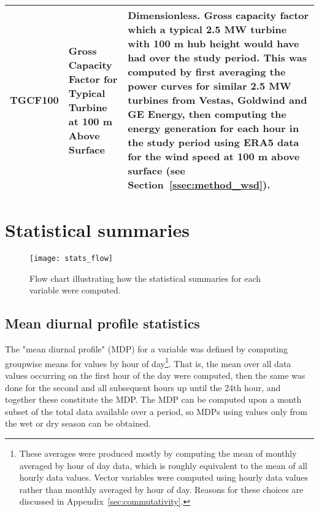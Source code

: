 \begin{landscape}
\begin{longtable}{P{2cm}P{3cm}P{15cm}}
			TGCF100 & Gross Capacity Factor for Typical Turbine at 100 m Above Surface & Dimensionless. Gross capacity factor which a typical 2.5 MW turbine with 100 m hub height would have had over the study period. This was computed by first averaging the power curves for similar 2.5 MW turbines from Vestas, Goldwind and GE Energy, then computing the energy generation for each hour in the study period using ERA5 data for the wind speed at 100 m above surface (see Section~\ref{ssec:method_wsd}). \\ \bottomrule
		\end{longtable}

	\endgroup
\end{landscape}

\section{Statistical summaries}
\label{sec:method_stats}

\begin{figure}[!ht]
	\centering
	\texttt{[image: stats\_flow]}
	\caption[Statistics Flow Chart]{Flow chart illustrating how the statistical summaries for each variable were computed.}
	\label{fig:stats_flow}
\end{figure}

\subsection{Mean diurnal profile statistics}
\label{ssec:method_mdp}

The "mean diurnal profile" (\ac{MDP}) for a variable was defined by computing groupwise means for values by hour of day\footnote{These averages were produced mostly by computing the mean of monthly averaged by hour of day data, which is roughly equivalent to the mean of all hourly data values. Vector variables were computed using hourly data values rather than monthly averaged by hour of day. Reasons for these choices are discussed in Appendix~\ref{sec:commutativity}.}. That is, the mean over all data values occurring on the first hour of the day were computed, then the same was done for the second and all subsequent hours up until the 24th hour, and together these constitute the \ac{MDP}. The \ac{MDP} can be computed upon a month subset of the total data available over a period, so \ac{MDP}s using values only from the wet or dry season can be obtained. 

